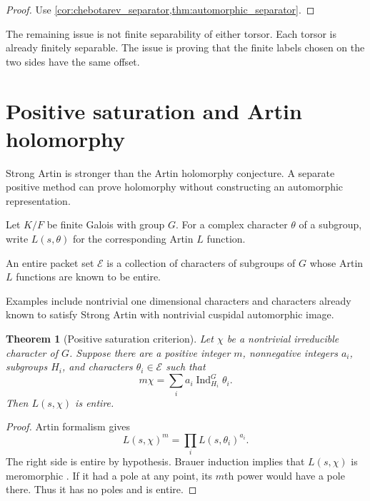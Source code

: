\documentclass{aomart}
\newtheorem{theorem}{Theorem}[section]
\theoremstyle{definition}
\theoremstyle{remark}
\newcommand{\Ind}{\operatorname{Ind}}
\newcommand{\calE}{\mathcal E}
\begin{document}
\begin{proof}
Use \cref{cor:chebotarev_separator,thm:automorphic_separator}.
\end{proof}

\begin{remark}\label{rem:separator_offset}
The remaining issue is not finite separability of either torsor. Each torsor is already finitely separable. The issue is proving that the finite labels chosen on the two sides have the same offset.
\end{remark}

\section{Positive saturation and Artin holomorphy}\label{sec:positive_cone}

Strong Artin is stronger than the Artin holomorphy conjecture. A separate positive method can prove holomorphy without constructing an automorphic representation.

Let \(K/F\) be finite Galois with group \(G\). For a complex character \(\theta\) of a subgroup, write \(L(s,\theta)\) for the corresponding Artin \(L\) function.

\begin{definition}\label{def:entire_packet_set}
An entire packet set \(\calE\) is a collection of characters of subgroups of \(G\) whose Artin \(L\) functions are known to be entire.
\end{definition}

Examples include nontrivial one dimensional characters and characters already known to satisfy Strong Artin with nontrivial cuspidal automorphic image.

\begin{theorem}[Positive saturation criterion]\label{thm:positive_saturation}
Let \(\chi\) be a nontrivial irreducible character of \(G\). Suppose there are a positive integer \(m\), nonnegative integers \(a_i\), subgroups \(H_i\), and characters \(\theta_i\in\calE\) such that
\[
 \boxed{
 m\chi
 =
 \sum_i
 a_i\Ind_{H_i}^G\theta_i.
 }
\]
Then \(L(s,\chi)\) is entire.
\end{theorem}

\begin{proof}
Artin formalism gives
\[
 L(s,\chi)^m
 =
 \prod_iL(s,\theta_i)^{a_i}.
\]
The right side is entire by hypothesis. Brauer induction implies that \(L(s,\chi)\) is meromorphic \cite{Brauer1947}. If it had a pole at any point, its \(m\)th power would have a pole there. Thus it has no poles and is entire.
\end{proof}
\end{document}
